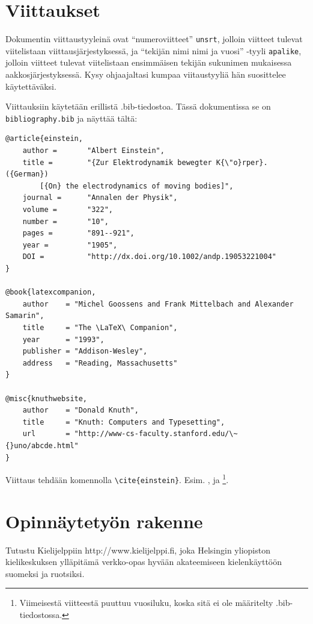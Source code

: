 \documentclass[finnish,twoside,openright]{HYgradu}
\begin{document}
\chapter{Viittaukset}

Dokumentin viittaustyylein\"a ovat ``numeroviitteet'' \texttt{unsrt}, jolloin viitteet tulevat viitelistaan viittausj\"arjestyksess\"a,  ja  ``tekij\"an nimi nimi ja vuosi'' -tyyli \texttt{apalike}, jolloin viitteet tulevat viitelistaan ensimm\"aisen tekij\"an sukunimen mukaisessa aakkosj\"arjestyksess\"a. Kysy ohjaajaltasi kumpaa viitaustyyli\"a h\"an suosittelee k\"aytett\"av\"aksi.

Viittauksiin k\"aytet\"a\"an erillist\"a .bib-tiedostoa. T\"ass\"a dokumentissa se on \texttt{bibliography.bib} ja n\"aytt\"a\"a t\"alt\"a:
\begin{verbatim}
@article{einstein,
    author =       "Albert Einstein",
    title =        "{Zur Elektrodynamik bewegter K{\"o}rper}. ({German})
        [{On} the electrodynamics of moving bodies]",
    journal =      "Annalen der Physik",
    volume =       "322",
    number =       "10",
    pages =        "891--921",
    year =         "1905",
    DOI =          "http://dx.doi.org/10.1002/andp.19053221004"
}
 
@book{latexcompanion,
    author    = "Michel Goossens and Frank Mittelbach and Alexander Samarin",
    title     = "The \LaTeX\ Companion",
    year      = "1993",
    publisher = "Addison-Wesley",
    address   = "Reading, Massachusetts"
}
 
@misc{knuthwebsite,
    author    = "Donald Knuth",
    title     = "Knuth: Computers and Typesetting",
    url       = "http://www-cs-faculty.stanford.edu/\~{}uno/abcde.html"
}
\end{verbatim}

Viittaus tehd\"a\"an komennolla \texttt{\textbackslash cite\{einstein\}}. Esim. 
\cite{einstein}, \cite{latexcompanion} ja \cite{knuthwebsite}\footnote{Viimeisest\"a viitteest\"a puuttuu vuosiluku, koska sit\"a ei ole m\"a\"aritelty .bib-tiedostossa.}.

\chapter{ Opinn\"aytety\"on rakenne}

Tutustu Kielijelppiin http://www.kielijelppi.fi, joka Helsingin  yliopiston kielikeskuksen yll\"apit\"am\"a verkko-opas hyv\"a\"an akateemiseen kielenk\"aytt\"o\"on suomeksi ja ruotsiksi.  
\end{document}
